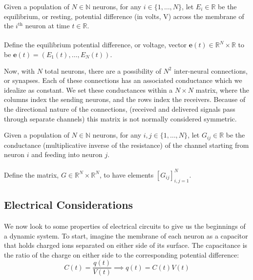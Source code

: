 \documentclass{article}
\begin{document}
\begin{definition}[$\mathbf{e}(t) = \textbf{equilibrium potential vector}$]\label{e}
Given a population of $N\in\mathbb{N}$ neurons, for any $i \in \{ 1, \dots, N \}$, let $E_{i}\in\mathbb{R}$ be the equilibrium, or resting, potential difference (in volts, V) across the membrane of the $i^{\text{th}}$ neuron at time $t\in\mathbb{R}$.\\
\\
Define the equilibrium potential difference, or voltage, vector $\mathbf{e}(t)\in\mathbb{R}^{N}\times\mathbb{R}$ to be $\mathbf{e}(t) = ( E_{1}(t), \dots, E_{N}(t) )$. 
\end{definition}

Now, with $N$ total neurons, there are a possibility of $N^{2}$ inter-neural connections, or synapses. Each of these connections has an associated conductance which we idealize as constant. We set these conductances within a $N\times N$ matrix, where the columns index the sending neurons, and the rows index the receivers. Because of the directional nature of the connections, (received and delivered signals pass through separate channels) this matrix is not normally considered symmetric.

\begin{definition}[$G = \textbf{conductance matrix}$]\label{G}
Given a population of $N\in\mathbb{N}$ neurons, for any $i,j \in \{ 1, \dots, N \}$, let $G_{ij}\in\mathbb{R}$ be the conductance (multiplicative inverse of the resistance) of the channel starting from neuron $i$ and feeding into neuron $j$.\\
\\
Define the matrix, $G\in\mathbb{R}^{N}\times\mathbb{R}^{N}$, to have elements $[ G_{ij} ]_{i,j=1}^{N}$.
\end{definition}

\subsection{Electrical Considerations}

\paragraph{}
We now look to some properties of electrical circuits to give us the beginnings of a dynamic system. To start, imagine the membrane of each neuron as a capacitor that holds charged ions separated on either side of its surface. The capacitance is the ratio of the charge on either side to the corresponding potential difference:
\[ C(t) = \frac{q(t)}{V(t)} \implies q(t) = C(t)V(t) \]
\end{document}
